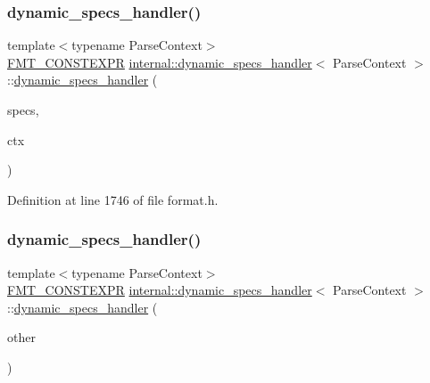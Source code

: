 \subsubsection{\texorpdfstring{dynamic\+\_\+specs\+\_\+handler()}{dynamic\_specs\_handler()}\hspace{0.1cm}{\footnotesize\ttfamily [1/2]}}
{\footnotesize\ttfamily template$<$typename Parse\+Context$>$ \\
\hyperlink{core_8h_a69201cb276383873487bf68b4ef8b4cd}{F\+M\+T\+\_\+\+C\+O\+N\+S\+T\+E\+X\+PR} \hyperlink{classinternal_1_1dynamic__specs__handler}{internal\+::dynamic\+\_\+specs\+\_\+handler}$<$ Parse\+Context $>$\+::\hyperlink{classinternal_1_1dynamic__specs__handler}{dynamic\+\_\+specs\+\_\+handler} (\begin{DoxyParamCaption}\item[{\hyperlink{structinternal_1_1dynamic__format__specs}{dynamic\+\_\+format\+\_\+specs}$<$ \hyperlink{classinternal_1_1dynamic__specs__handler_a718fa7f12b9f1a5c59fa747214d18f13}{char\+\_\+type} $>$ \&}]{specs,  }\item[{Parse\+Context \&}]{ctx }\end{DoxyParamCaption})\hspace{0.3cm}{\ttfamily [inline]}}



Definition at line 1746 of file format.\+h.

\mbox{\label{classinternal_1_1dynamic__specs__handler_a658c0d84c7d999b88ed378016d40f7bf}} 
\subsubsection{\texorpdfstring{dynamic\+\_\+specs\+\_\+handler()}{dynamic\_specs\_handler()}\hspace{0.1cm}{\footnotesize\ttfamily [2/2]}}
{\footnotesize\ttfamily template$<$typename Parse\+Context$>$ \\
\hyperlink{core_8h_a69201cb276383873487bf68b4ef8b4cd}{F\+M\+T\+\_\+\+C\+O\+N\+S\+T\+E\+X\+PR} \hyperlink{classinternal_1_1dynamic__specs__handler}{internal\+::dynamic\+\_\+specs\+\_\+handler}$<$ Parse\+Context $>$\+::\hyperlink{classinternal_1_1dynamic__specs__handler}{dynamic\+\_\+specs\+\_\+handler} (\begin{DoxyParamCaption}\item[{const \hyperlink{classinternal_1_1dynamic__specs__handler}{dynamic\+\_\+specs\+\_\+handler}$<$ Parse\+Context $>$ \&}]{other }\end{DoxyParamCaption})\hspace{0.3cm}{\ttfamily [inline]}}



